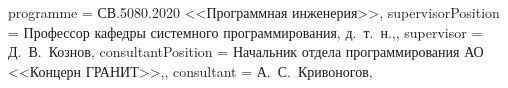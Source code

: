 {    %
    programme          = {СВ.5080.2020 <<Программная инженерия>>},
    supervisorPosition = {Профессор кафедры системного программирования, д.~т.~н.,}, %
    supervisor         = {Д.~В.~Кознов},
    consultantPosition = {Начальник отдела программирования АО <<Концерн ГРАНИТ>>,},
    consultant         = {А.~С.~Кривоногов},
}

